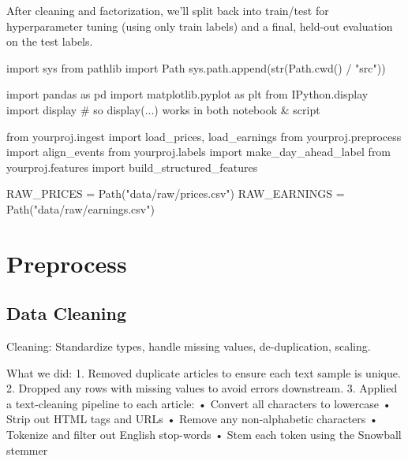 \documentclass[
  letterpaper,
  DIV=11,
  numbers=noendperiod]{scrartcl}
\newenvironment{Shaded}{\begin{snugshade}}{\end{snugshade}}
\newcommand{\BuiltInTok}[1]{\textcolor[rgb]{0.00,0.23,0.31}{#1}}
\newcommand{\CommentTok}[1]{\textcolor[rgb]{0.37,0.37,0.37}{#1}}
\newcommand{\ImportTok}[1]{\textcolor[rgb]{0.00,0.46,0.62}{#1}}
\newcommand{\NormalTok}[1]{\textcolor[rgb]{0.00,0.23,0.31}{#1}}
\newcommand{\OperatorTok}[1]{\textcolor[rgb]{0.37,0.37,0.37}{#1}}
\newcommand{\StringTok}[1]{\textcolor[rgb]{0.13,0.47,0.30}{#1}}
\renewenvironment{Shaded}{%
  \begin{tcolorbox}[%
    enhanced,%
    colback=codebg,%
    colframe=codebg,%
    borderline west={3pt}{0pt}{sectionblue},%
    boxrule=0pt,%
    arc=0pt,%
    boxsep=5pt,%
    left=2mm,%
    right=2mm,%
    top=2mm,%
    bottom=2mm%
  ]%
}{%
  \end{tcolorbox}%
}
\begin{document}
After cleaning and factorization, we'll split back into train/test for
hyperparameter tuning (using only train labels) and a final, held-out
evaluation on the test labels.

\begin{Shaded}
\begin{Highlighting}[]
\ImportTok{import}\NormalTok{ sys}
\ImportTok{from}\NormalTok{ pathlib }\ImportTok{import}\NormalTok{ Path}
\NormalTok{sys.path.append(}\BuiltInTok{str}\NormalTok{(Path.cwd() }\OperatorTok{/} \StringTok{"src"}\NormalTok{))}

\ImportTok{import}\NormalTok{ pandas }\ImportTok{as}\NormalTok{ pd}
\ImportTok{import}\NormalTok{ matplotlib.pyplot }\ImportTok{as}\NormalTok{ plt}
\ImportTok{from}\NormalTok{ IPython.display }\ImportTok{import}\NormalTok{ display  }\CommentTok{\# so display(...) works in both notebook \& script}

\ImportTok{from}\NormalTok{ yourproj.ingest }\ImportTok{import}\NormalTok{ load\_prices, load\_earnings}
\ImportTok{from}\NormalTok{ yourproj.preprocess }\ImportTok{import}\NormalTok{ align\_events}
\ImportTok{from}\NormalTok{ yourproj.labels }\ImportTok{import}\NormalTok{ make\_day\_ahead\_label}
\ImportTok{from}\NormalTok{ yourproj.features }\ImportTok{import}\NormalTok{ build\_structured\_features}

\NormalTok{RAW\_PRICES }\OperatorTok{=}\NormalTok{ Path(}\StringTok{"data/raw/prices.csv"}\NormalTok{)}
\NormalTok{RAW\_EARNINGS }\OperatorTok{=}\NormalTok{ Path(}\StringTok{"data/raw/earnings.csv"}\NormalTok{)}
\end{Highlighting}
\end{Shaded}

\section{Preprocess}\label{preprocess}

\subsection{Data Cleaning}\label{data-cleaning}

Cleaning: Standardize types, handle missing values, de-duplication,
scaling.

What we did: 1. Removed duplicate articles to ensure each text sample is
unique. 2. Dropped any rows with missing values to avoid errors
downstream. 3. Applied a text-cleaning pipeline to each article: •
Convert all characters to lowercase • Strip out HTML tags and URLs •
Remove any non-alphabetic characters • Tokenize and filter out English
stop-words • Stem each token using the Snowball stemmer
\end{document}
